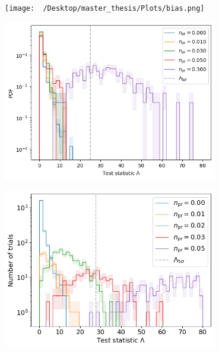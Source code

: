 \documentclass[aspectratio=1610, 9pt]{beamer}
\begin{document}
\begin{frame}
  \texttt{[image: ~/Desktop/master\_thesis/Plots/bias.png]}
\end{frame}
\begin{frame}
  \includegraphics[width=0.7\textwidth]{../Plots/test_statistic}
\end{frame}
\begin{frame}
  \includegraphics[width=0.7\textwidth]{../Plots/test_statisti_previous}
\end{frame}
\end{document}
